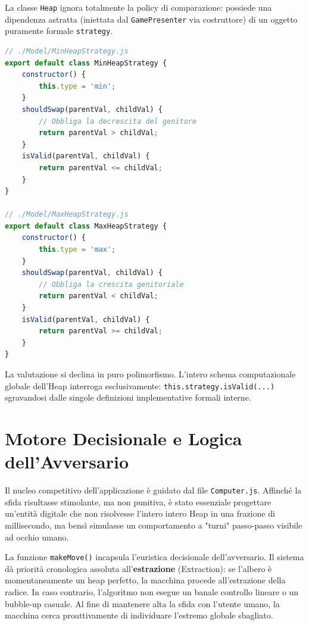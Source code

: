 \documentclass[openany]{theme/uniprthesis}
\begin{document}
La classe \texttt{Heap} ignora totalmente la policy di comparazione: possiede una dipendenza astratta (iniettata dal \texttt{GamePresenter} via costruttore) di un oggetto puramente formale \texttt{strategy}.
\begin{lstlisting}[language=JavaScript, breaklines=true, basicstyle=\footnotesize\ttfamily, frame=single, caption={Definizione separata delle regole di comparazione (Pattern Strategy)}, keywordstyle=\color{blue}]
// ./Model/MinHeapStrategy.js
export default class MinHeapStrategy {
    constructor() {
        this.type = 'min';
    }
    shouldSwap(parentVal, childVal) {
        // Obbliga la decrescita del genitore
        return parentVal > childVal; 
    }
    isValid(parentVal, childVal) {
        return parentVal <= childVal;
    }
}

// ./Model/MaxHeapStrategy.js
export default class MaxHeapStrategy {
    constructor() {
        this.type = 'max';
    }
    shouldSwap(parentVal, childVal) {
        // Obbliga la crescita genitoriale
        return parentVal < childVal;
    }
    isValid(parentVal, childVal) {
        return parentVal >= childVal;
    }
}
\end{lstlisting}

La valutazione si declina in puro polimorfismo. L'intero schema computazionale globale dell'Heap interroga esclusivamente: \texttt{this.strategy.isValid(...)} sgravandosi dalle singole definizioni implementative formali interne.

\section{Motore Decisionale e Logica dell'Avversario}
Il nucleo competitivo dell'applicazione è guidato dal file \texttt{Computer.js}. Affinché la sfida risultasse stimolante, ma non punitiva, è stato essenziale progettare un'entità digitale che non risolvesse l'intero intero Heap in una frazione di millisecondo, ma bensì simulasse un comportamento a "turni" passo-passo visibile ad occhio umano.

La funzione \texttt{makeMove()} incapsula l'euristica decisionale dell'avversario. Il sistema dà priorità cronologica assoluta all'\textbf{estrazione} (Extraction): se l'albero è momentaneamente un heap perfetto, la macchina procede all'estrazione della radice.
In caso contrario, l'algoritmo non esegue un banale controllo lineare o un bubble-up casuale. Al fine di mantenere alta la sfida con l'utente umano, la macchina cerca proattivamente di individuare l'estremo globale sbagliato.
\end{document}
